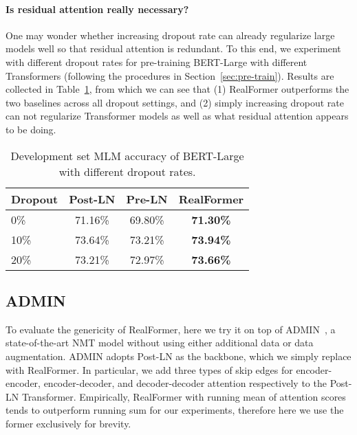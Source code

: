 \documentclass[11pt,a4paper]{article}
\begin{document}
\paragraph{Is residual attention really necessary?}
One may wonder whether increasing dropout rate can already regularize large models well so that residual attention is redundant. To this end, we experiment with different dropout rates for pre-training BERT-Large with different Transformers (following the procedures in Section~\ref{sec:pre-train}). Results are collected in Table~\ref{table:dropout}, from which we can see that (1) RealFormer outperforms the two baselines across all dropout settings, and (2) simply increasing dropout rate can not regularize Transformer models as well as what residual attention appears to be doing.


\begin{table}
\centering
\begin{tabular}{l|ccc}
\hline \textbf{Dropout} & \textbf{Post-LN} & \textbf{Pre-LN} & \textbf{RealFormer} \\ \hline
0\%\footnotemark   & 71.16\%  & 69.80\%  & \textbf{71.30\%}  \\
10\%  & 73.64\%  & 73.21\%   & \textbf{73.94\%}  \\
20\%  & 73.21\%  & 72.97\%   & \textbf{73.66\%}  \\
\hline
\end{tabular}
\caption{Development set MLM accuracy of BERT-Large with different dropout rates.}
\label{table:dropout}
\end{table}



\subsection{ADMIN}
To evaluate the genericity of RealFormer, here we try it on top of ADMIN~\citep{Liu-2020-admin}, a state-of-the-art NMT model without using either additional data or data augmentation. 
ADMIN adopts Post-LN as the backbone, which we simply replace with RealFormer.
In particular, we add three types of skip edges for encoder-encoder, encoder-decoder, and decoder-decoder attention respectively to the Post-LN Transformer. 
Empirically, RealFormer with running mean of attention scores tends to outperform running sum for our experiments, therefore here we use the former exclusively for brevity.
\end{document}
